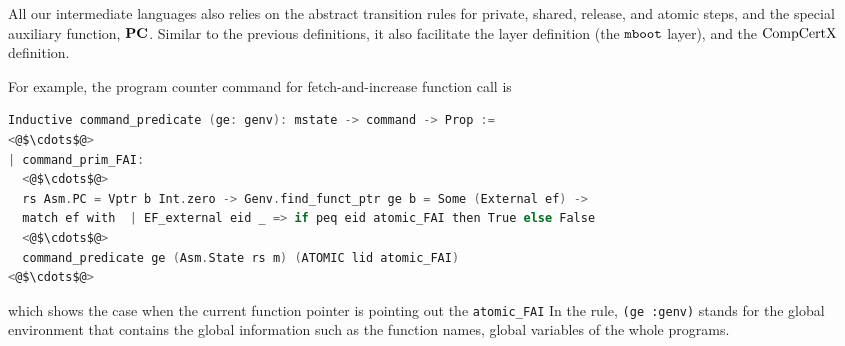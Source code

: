 %

All our intermediate languages 
also relies on the abstract transition rules for 
private, shared, release, and atomic steps, and the special auxiliary function, ${\mathrm{\textbf{PC}}}$.
Similar to the previous definitions, 
it also facilitate the layer definition (the ${\mathrm{\texttt{mboot}}}$ layer), 
and the $\mathrm{CompCertX}$ definition.

For example, the program counter command
for fetch-and-increase function call is
\begin{lstlisting}[language=C]
Inductive command_predicate (ge: genv): mstate -> command -> Prop :=
<@$\cdots$@>
| command_prim_FAI:
  <@$\cdots$@>
  rs Asm.PC = Vptr b Int.zero -> Genv.find_funct_ptr ge b = Some (External ef) ->
  match ef with  | EF_external eid _ => if peq eid atomic_FAI then True else False
  <@$\cdots$@>
  command_predicate ge (Asm.State rs m) (ATOMIC lid atomic_FAI)
<@$\cdots$@>
\end{lstlisting}
which shows the case when the current function pointer is pointing out the \lstinline$atomic_FAI$
In the rule, \lstinline$(ge :genv)$ stands for the global environment that contains the 
global information such as the function names, global variables of the whole programs.

